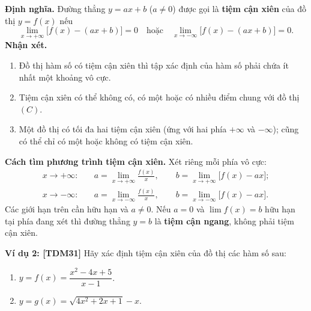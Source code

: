 \documentclass[12pt,a4paper]{article}
\newcommand{\example}[2][TDM21]{\par\vspace{3pt}\noindent\textbf{\textcolor{sectionpurple}{Ví dụ #2:} \textcolor{noteborder}{[#1]}}\enspace}
\newcommand{\tightitem}{\setlength{\itemsep}{1pt}\setlength{\topsep}{1pt}\setlength{\parsep}{0pt}\setlength{\partopsep}{0pt}}
\begin{document}
\textbf{Định nghĩa.} Đường thẳng $y=ax+b$ ($a\ne0$) được gọi là \textbf{tiệm cận xiên} của đồ thị $y=f(x)$ nếu
\[
  \lim_{x\to+\infty}\bigl[f(x)-(ax+b)\bigr]=0
  \quad\text{hoặc}\quad
  \lim_{x\to-\infty}\bigl[f(x)-(ax+b)\bigr]=0.
\]
\textbf{Nhận xét.}
\begin{enumerate}\tightitem
  \item Đồ thị hàm số có tiệm cận xiên thì tập xác định của hàm số phải chứa ít nhất một khoảng vô cực.
  \item Tiệm cận xiên có thể không có, có một hoặc có nhiều điểm chung với đồ thị $(C)$.
  \item Một đồ thị có tối đa hai tiệm cận xiên (ứng với hai phía $+\infty$ và $-\infty$); cũng có thể chỉ có một hoặc không có tiệm cận xiên.
\end{enumerate}
\textbf{Cách tìm phương trình tiệm cận xiên.} Xét riêng mỗi phía vô cực:
\[
\begin{aligned}
 x\to+\infty:&\quad a=\lim_{x\to+\infty}\frac{f(x)}{x},\qquad
 b=\lim_{x\to+\infty}\bigl[f(x)-ax\bigr];\\
 x\to-\infty:&\quad a=\lim_{x\to-\infty}\frac{f(x)}{x},\qquad
 b=\lim_{x\to-\infty}\bigl[f(x)-ax\bigr].
\end{aligned}
\]
Các giới hạn trên cần hữu hạn và $a\ne0$. Nếu $a=0$ và $\lim f(x)=b$ hữu hạn tại phía đang xét thì đường thẳng $y=b$ là \textbf{tiệm cận ngang}, không phải tiệm cận xiên.
\begin{notebox}
\example[TDM31]{2} Hãy xác định tiệm cận xiên của đồ thị các hàm số sau:
\begin{enumerate}\tightitem
\item $y=f(x)=\dfrac{x^2-4x+5}{x-1}$.
\item $y=g(x)=\sqrt{4x^2+2x+1}-x$.
\end{enumerate}
\end{notebox}
\end{document}
